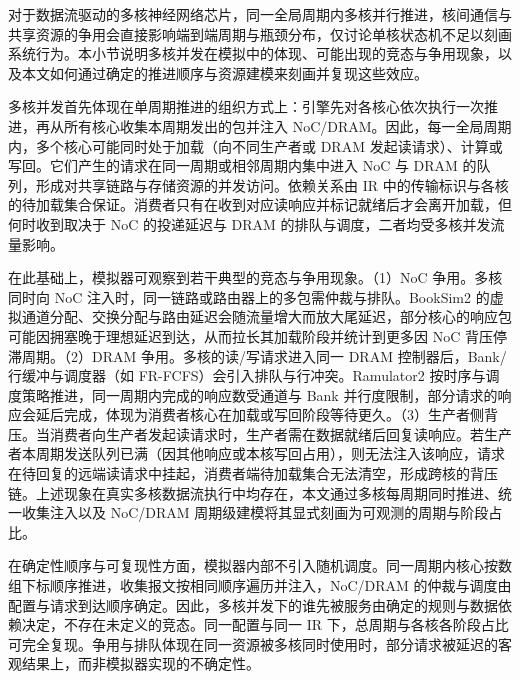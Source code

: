 

对于数据流驱动的多核神经网络芯片，同一全局周期内多核并行推进，核间通信与共享资源的争用会直接影响端到端周期与瓶颈分布，仅讨论单核状态机不足以刻画系统行为。本小节说明多核并发在模拟中的体现、可能出现的竞态与争用现象，以及本文如何通过确定的推进顺序与资源建模来刻画并复现这些效应。

多核并发首先体现在单周期推进的组织方式上：引擎先对各核心依次执行一次推进，再从所有核心收集本周期发出的包并注入 NoC/DRAM。因此，每一全局周期内，多个核心可能同时处于加载（向不同生产者或 DRAM 发起读请求）、计算或写回。它们产生的请求在同一周期或相邻周期内集中进入 NoC 与 DRAM 的队列，形成对共享链路与存储资源的并发访问。依赖关系由 IR 中的传输标识与各核的待加载集合保证。消费者只有在收到对应读响应并标记就绪后才会离开加载，但何时收到取决于 NoC 的投递延迟与 DRAM 的排队与调度，二者均受多核并发流量影响。

在此基础上，模拟器可观察到若干典型的竞态与争用现象。（1）NoC 争用。多核同时向 NoC 注入时，同一链路或路由器上的多包需仲裁与排队。BookSim2 的虚拟通道分配、交换分配与路由延迟会随流量增大而放大尾延迟，部分核心的响应包可能因拥塞晚于理想延迟到达，从而拉长其加载阶段并统计到更多因 NoC 背压停滞周期。（2）DRAM 争用。多核的读/写请求进入同一 DRAM 控制器后，Bank/行缓冲与调度器（如 FR-FCFS）会引入排队与行冲突。Ramulator2 按时序与调度策略推进，同一周期内完成的响应数受通道与 Bank 并行度限制，部分请求的响应会延后完成，体现为消费者核心在加载或写回阶段等待更久。（3）生产者侧背压。当消费者向生产者发起读请求时，生产者需在数据就绪后回复读响应。若生产者本周期发送队列已满（因其他响应或本核写回占用），则无法注入该响应，请求在待回复的远端读请求中挂起，消费者端待加载集合无法清空，形成跨核的背压链。上述现象在真实多核数据流执行中均存在，本文通过多核每周期同时推进、统一收集注入以及 NoC/DRAM 周期级建模将其显式刻画为可观测的周期与阶段占比。

在确定性顺序与可复现性方面，模拟器内部不引入随机调度。同一周期内核心按数组下标顺序推进，收集报文按相同顺序遍历并注入，NoC/DRAM 的仲裁与调度由配置与请求到达顺序确定。因此，多核并发下的谁先被服务由确定的规则与数据依赖决定，不存在未定义的竞态。同一配置与同一 IR 下，总周期与各核各阶段占比可完全复现。争用与排队体现在同一资源被多核同时使用时，部分请求被延迟的客观结果上，而非模拟器实现的不确定性。

